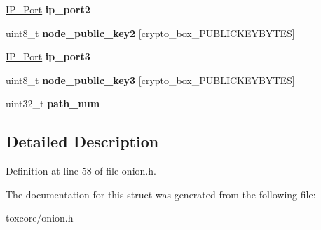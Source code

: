 \begin{DoxyCompactItemize}
\item 
\hypertarget{struct_onion___path_adcf789584e4efc296bc6f915d3e2e9f9}{\hyperlink{struct_i_p___port}{I\+P\+\_\+\+Port} {\bfseries ip\+\_\+port2}}\label{struct_onion___path_adcf789584e4efc296bc6f915d3e2e9f9}

\item 
\hypertarget{struct_onion___path_adc5a9730c2f43085e83ece3257af154a}{uint8\+\_\+t {\bfseries node\+\_\+public\+\_\+key2} \mbox{[}crypto\+\_\+box\+\_\+\+P\+U\+B\+L\+I\+C\+K\+E\+Y\+B\+Y\+T\+E\+S\mbox{]}}\label{struct_onion___path_adc5a9730c2f43085e83ece3257af154a}

\item 
\hypertarget{struct_onion___path_aef20a4d17084ae724f2e496f8f7a106a}{\hyperlink{struct_i_p___port}{I\+P\+\_\+\+Port} {\bfseries ip\+\_\+port3}}\label{struct_onion___path_aef20a4d17084ae724f2e496f8f7a106a}

\item 
\hypertarget{struct_onion___path_a4725b29fc0349714fa0ab0938844cf19}{uint8\+\_\+t {\bfseries node\+\_\+public\+\_\+key3} \mbox{[}crypto\+\_\+box\+\_\+\+P\+U\+B\+L\+I\+C\+K\+E\+Y\+B\+Y\+T\+E\+S\mbox{]}}\label{struct_onion___path_a4725b29fc0349714fa0ab0938844cf19}

\item 
\hypertarget{struct_onion___path_a6d69f3ea5100411c3599020055b8b78c}{uint32\+\_\+t {\bfseries path\+\_\+num}}\label{struct_onion___path_a6d69f3ea5100411c3599020055b8b78c}

\end{DoxyCompactItemize}


\subsection{Detailed Description}


Definition at line 58 of file onion.\+h.



The documentation for this struct was generated from the following file\+:\begin{DoxyCompactItemize}
\item 
toxcore/onion.\+h\end{DoxyCompactItemize}
